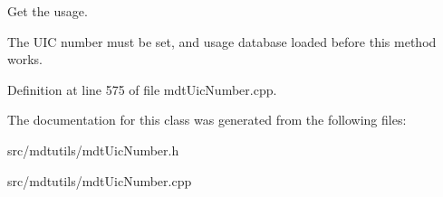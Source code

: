 Get the usage. 

The UIC number must be set, and usage database loaded before this method works. 

Definition at line 575 of file mdtUicNumber.cpp.



The documentation for this class was generated from the following files:\begin{DoxyCompactItemize}
\item 
src/mdtutils/mdtUicNumber.h\item 
src/mdtutils/mdtUicNumber.cpp\end{DoxyCompactItemize}

